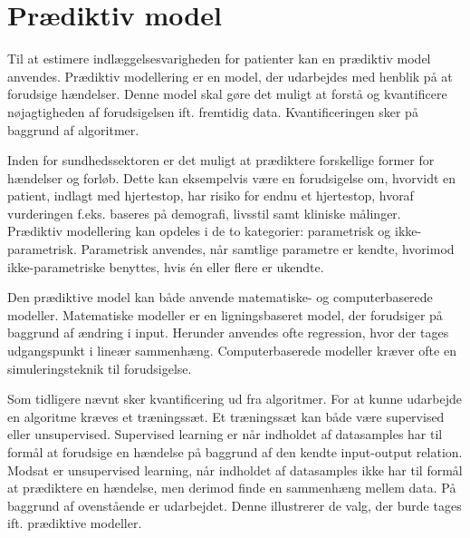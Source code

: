 \section{Prædiktiv model} \label{prae_model}
\noindent
Til at estimere indlæggelsesvarigheden for patienter kan en prædiktiv model anvendes. 
Prædiktiv modellering er en model, der udarbejdes med henblik på at forudsige hændelser. Denne model skal gøre det muligt at forstå og kvantificere nøjagtigheden af forudsigelsen ift. fremtidig data.\cite{Kuhn2013} Kvantificeringen sker på baggrund af algoritmer. 


Inden for sundhedssektoren er det muligt at prædiktere forskellige former for hændelser og forløb. Dette kan eksempelvis være en forudsigelse om, hvorvidt en patient, indlagt med hjertestop, har risiko for endnu et hjertestop, hvoraf vurderingen f.eks. baseres på demografi, livsstil samt kliniske målinger\cite{Hastie2008}.  \\

\noindent
Prædiktiv modellering kan opdeles i de to kategorier: parametrisk og ikke-parametrisk. Parametrisk anvendes, når samtlige parametre er kendte, hvorimod ikke-parametriske benyttes, hvis én eller flere er ukendte.\cite{Sheskin2000} %


Den prædiktive model kan både anvende matematiske- og computerbaserede modeller. Matematiske modeller er en ligningsbaseret model, der forudsiger på baggrund af ændring i input. Herunder anvendes ofte regression, hvor der tages udgangspunkt i lineær sammenhæng. Computerbaserede modeller kræver ofte en simuleringsteknik til forudsigelse.\cite{MathWorks2016}


Som tidligere nævnt sker kvantificering ud fra algoritmer. For at kunne udarbejde en algoritme kræves et træningssæt\cite{DIKU2010}. Et træningssæt kan både være supervised eller unsupervised. Supervised learning er når indholdet af datasamples har til formål at forudsige en hændelse på baggrund af den kendte input-output relation\cite{Brownlee2013}. Modsat er unsupervised learning, når indholdet af datasamples ikke har til formål at prædiktere en hændelse, men derimod finde en sammenhæng mellem data\cite{Brownlee2013, Kuhn2013}. %
På baggrund af ovenstående er  udarbejdet. Denne illustrerer de valg, der burde tages ift. prædiktive modeller.

